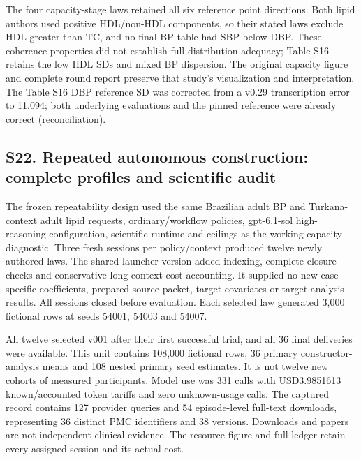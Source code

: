 \documentclass[11pt,letterpaper]{article}
\begin{document}
The four capacity-stage laws retained all six reference point directions. Both lipid authors used positive HDL/\allowbreak{}non-HDL components, so their stated laws exclude HDL greater than TC, and no final BP table had SBP below DBP. These coherence properties did not establish full-distribution adequacy; Table S16 retains the low HDL SDs and mixed BP dispersion. The original capacity figure and complete round report preserve that study's visualization and interpretation. The Table S16 DBP reference SD was corrected from a v0.29 transcription error to 11.094; both underlying evaluations and the pinned reference were already correct (reconciliation).


\clearpage

\subsection*{S22. Repeated autonomous construction: complete profiles and scientific audit}

The frozen repeatability design used the same Brazilian adult BP and Turkana-context adult lipid requests, ordinary/\allowbreak{}workflow policies, gpt-6.1-sol high-reasoning configuration, scientific runtime and ceilings as the working capacity diagnostic. Three fresh sessions per policy/\allowbreak{}context produced twelve newly authored laws. The shared launcher version added indexing, complete-closure checks and conservative long-context cost accounting. It supplied no new case-specific coefficients, prepared source packet, target covariates or target analysis results. All sessions closed before evaluation. Each selected law generated 3,000 fictional rows at seeds 54001, 54003 and 54007.


All twelve selected v001 after their first successful trial, and all 36 final deliveries were available. This unit contains 108,000 fictional rows, 36 primary constructor-analysis means and 108 nested primary seed estimates. It is not twelve new cohorts of measured participants. Model use was 331 calls with USD3.9851613 known/\allowbreak{}accounted token tariffs and zero unknown-usage calls. The captured record contains 127 provider queries and 54 episode-level full-text downloads, representing 36 distinct PMC identifiers and 38 versions. Downloads and papers are not independent clinical evidence. The resource figure and full ledger retain every assigned session and its actual cost.


\FloatBarrier

\begingroup
\end{document}
